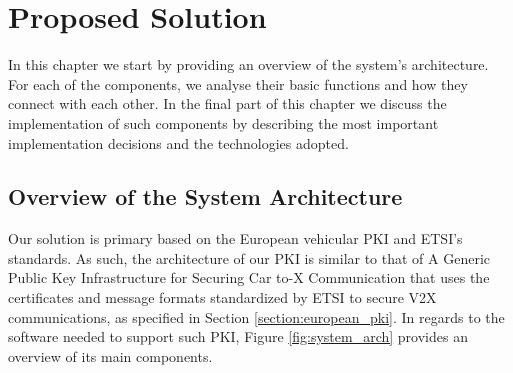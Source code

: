 \chapter{Proposed Solution}
\label{chapter:implementation}
In this chapter we start by providing an overview of the system's architecture. For each of the components, we analyse their basic functions and how they connect with each other. In the final part of this chapter we discuss the implementation of such components by describing the most important implementation decisions and the technologies adopted.



\section{Overview of the System Architecture}\label{section:architecture}
Our solution is primary based on the European vehicular PKI and ETSI's standards. As such, the architecture of our PKI is similar to that of A Generic Public Key Infrastructure for Securing Car to-X Communication \cite{generic_eu} that uses the certificates and message formats standardized by ETSI \cite{etsi_formats} to secure V2X communications, as specified in Section \ref{section:european_pki}. In regards to the software needed to support such PKI, Figure \ref{fig:system_arch} provides an overview of its main components.

